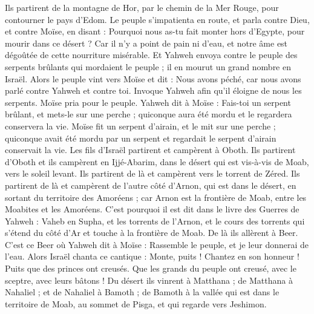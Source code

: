 \begin{multicols}{2}
Ils partirent de la montagne de Hor, par le chemin de la Mer Rouge, pour contourner le pays d'Edom. Le peuple s'impatienta en route,
et parla contre Dieu, et contre Moïse, en disant : Pourquoi nous as-tu fait monter hors d'Egypte, pour mourir dans ce désert ? Car il n'y a point de pain ni d'eau, et notre âme est dégoûtée de cette nourriture misérable.
Et Yahweh envoya contre le peuple des serpents brûlants qui mordaient le peuple ; il en mourut un grand nombre en Israël.
Alors le peuple vint vers Moïse et dit : Nous avons péché, car nous avons parlé contre Yahweh et contre toi. Invoque Yahweh afin qu'il éloigne de nous les serpents. Moïse pria pour le peuple.
Yahweh dit à Moïse : Fais-toi un serpent brûlant, et mets-le sur une perche ; quiconque aura été mordu et le regardera conservera la vie.
Moïse fit un serpent d'airain, et le mit sur une perche ; quiconque avait été mordu par un serpent et regardait le serpent d'airain conservait la vie.
Les fils d'Israël partirent et campèrent à Oboth.
Ils partirent d'Oboth et ils campèrent en Ijjé-Abarim, dans le désert qui est vis-à-vis de Moab, vers le soleil levant.
Ils partirent de là et campèrent vers le torrent de Zéred.
Ils partirent de là et campèrent de l'autre côté d'Arnon, qui est dans le désert, en sortant du territoire des Amoréens ; car Arnon est la frontière de Moab, entre les Moabites et les Amoréens.
C'est pourquoi il est dit dans le livre des Guerres de Yahweh : Vaheb en Supha, et les torrents de l'Arnon,
et le cours des torrents qui s'étend du côté d'Ar et touche à la frontière de Moab.
De là ils allèrent à Beer. C'est ce Beer où Yahweh dit à Moïse : Rassemble le peuple, et je leur donnerai de l'eau.
Alors Israël chanta ce cantique : Monte, puits ! Chantez en son honneur !
Puits que des princes ont creusés. Que les grands du peuple ont creusé, avec le sceptre, avec leurs bâtons ! Du désert ils vinrent à Matthana ;
de Matthana à Nahaliel ; et de Nahaliel à Bamoth ;
de Bamoth à la vallée qui est dans le territoire de Moab, au sommet de Pisga, et qui regarde vers Jeshimon.

\end{multicols}
